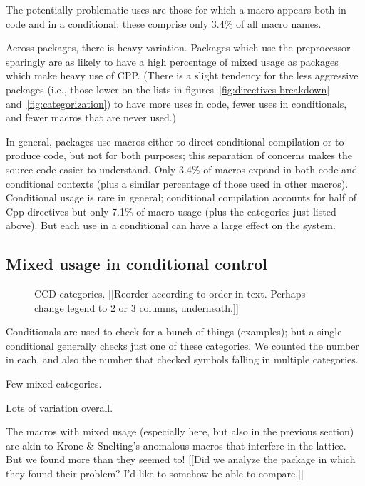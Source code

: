 \documentclass[10pt]{article}
\begin{document}
      The potentially problematic uses are those for which a macro appears
        both in code and in a conditional; these comprise only 3.4\% of all
        macro names.

      Across packages, there is heavy variation.  Packages which use
        the preprocessor sparingly are as likely to have a high percentage
        of mixed usage as packages which make heavy use of CPP.  (There is
        a slight tendency for the less aggressive packages (i.e.,
        those lower on the lists in figures~\ref{fig:directives-breakdown}
        and~\ref{fig:categorization}) to have more uses in code, fewer uses
        in conditionals, and fewer macros that are never used.)

In general, packages use macros either to direct conditional compilation or
to produce code, but not for both purposes; this separation of concerns
makes the source code easier to understand.  Only 3.4\% of macros expand in
both code and conditional contexts (plus a similar percentage of those used
in other macros). 
Conditional usage is rare in general; conditional compilation accounts for
half of Cpp directives but only 7.1\% of macro usage (plus the categories just
listed above).  But each use in a conditional can have a large effect on
the system.


\subsection{Mixed usage in conditional control}

\begin{figure}
\centerline{}
\caption{CCD categories.  [[Reorder according to order in text.  Perhaps
  change legend to 2 or 3 columns, underneath.]]}
\label{fig:ccd-categories}
\end{figure}


    Conditionals are used to check for a bunch of things (examples); but a
      single conditional generally checks just one of these categories.  We
      counted the number in each, and also the number that checked symbols
      falling in multiple categories.

    Few mixed categories.

    Lots of variation overall.

    The macros with mixed usage (especially here, but also in the previous
      section) are akin to Krone \& Snelting's anomalous macros that
      interfere in the lattice.  But we found more than they seemed to!
      [[Did we analyze the package in which they found their problem?
      I'd like to somehow be able to compare.]]
      
\end{document}
